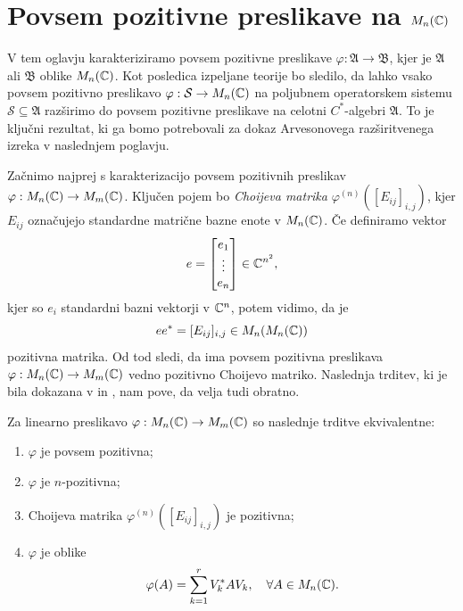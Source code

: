 \section{Povsem pozitivne preslikave na $M_n (\mathbb C)$}\label{sec:7}


V tem oglavju karakteriziramo povsem pozitivne preslikave $\varphi: \mathfrak{A} \to \mathfrak{B}$,
kjer je $\mathfrak{A}$ ali $\mathfrak{B}$ oblike $M_n (\mathbb C)$. 
Kot posledica izpeljane teorije bo sledilo, da lahko vsako povsem pozitivno preslikavo $\varphi: \mathcal{S} \to M_n (\mathbb C)$ 
na poljubnem operatorskem sistemu $\mathcal{S} \subseteq \mathfrak{A}$ razširimo do povsem pozitivne preslikave na celotni $C^*$-algebri $\mathfrak{A}$.
To je ključni rezultat, ki ga bomo potrebovali za dokaz Arvesonovega razširitvenega izreka v naslednjem poglavju.

Začnimo najprej s karakterizacijo povsem pozitivnih preslikav $\varphi: M_n (\mathbb C) \to M_m (\mathbb C)$.
Ključen pojem bo \emph{Choijeva matrika} $\varphi^{(n)}([E_{ij}]_{i, j})$, kjer $E_{ij}$ označujejo standardne matrične bazne enote v $M_n (\mathbb C)$.
Če definiramo vektor 
$$e = \begin{bmatrix}
    e_1 \\ \vdots \\ e_n
\end{bmatrix} \in \mathbb C^{n^2},$$
kjer so $e_i$ standardni bazni vektorji v $\mathbb C^n$, potem vidimo, da je 
$$e e^* = [E_{ij}]_{i, j} \in M_n (M_n (\mathbb C))$$
pozitivna matrika. 
Od tod sledi, da ima povsem pozitivna preslikava $\varphi: M_n (\mathbb C) \to M_m(\mathbb C)$ vedno pozitivno Choijevo matriko.
Naslednja trditev, ki je bila dokazana v \cite{kraus1971} in \cite{choi1975}, nam pove, da velja tudi obratno.

\begin{izrek}\label{izr:1.2}
    Za linearno preslikavo $\varphi: M_n (\mathbb C) \to M_m (\mathbb C)$ so naslednje trditve ekvivalentne:
    \begin{enumerate}
        \item $\varphi$ je povsem pozitivna;
        \item $\varphi$ je $n$-pozitivna;
        \item {Choijeva matrika} $\varphi^{(n)}([E_{ij}]_{i, j})$ je pozitivna;
        \item $\varphi$ je oblike 
        \begin{equation}
            \varphi(A) = \sum_{k = 1} ^r V_k ^* A V_k,\quad \forall A \in M_n (\mathbb C). \label{eq:1.6}
        \end{equation}
    \end{enumerate}
\end{izrek}


